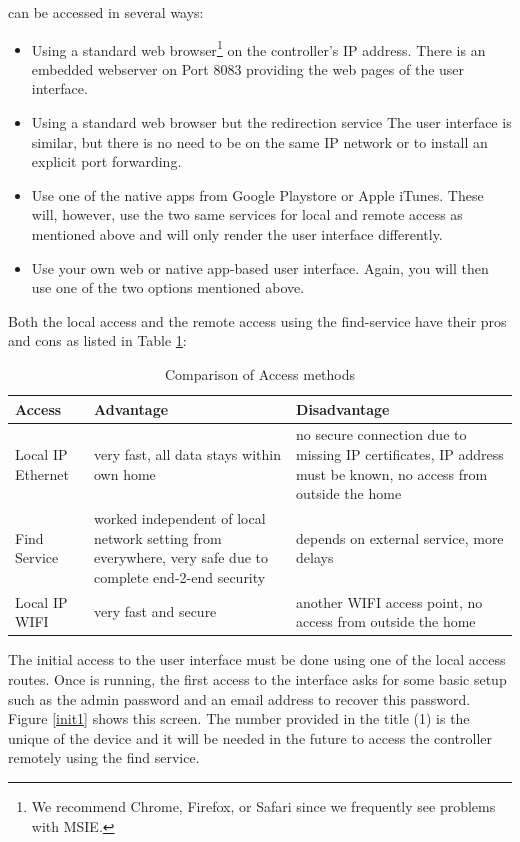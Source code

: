 \zway can be accessed in several ways:

\begin{itemize}
\item Using a standard web browser\footnote{We recommend Chrome, Firefox, or Safari 
since we frequently see problems with MSIE.} on the controller’s IP address. There is an 
embedded webserver on Port 8083 providing the web pages of the user interface.
\item Using a standard web browser but the redirection service  The 
user interface is similar, but there is no need to be on the same IP network or to 
install an explicit port forwarding.
\item Use one of the native apps from Google Playstore or Apple iTunes. These will, 
however, use the two same services for local and remote access as mentioned above and 
will only render the user interface differently.
\item Use your own web or native app-based user interface. Again, you will then use one 
of the two options mentioned above.
\end{itemize}

Both the local access and the remote access using the find-service have their pros and 
cons as listed in Table \ref{compaccess}:

\begin{table}
\begin{tabular}{|p{}|p{}|p{}|}
\hline
Access &	Advantage & Disadvantage\\
\hline
Local IP Ethernet&	very fast, all data stays within own home & no secure connection due
to missing IP certificates, IP address must be known, no access from outside the home\\
\hline
Find Service &	worked independent of local network setting from everywhere, very safe
due to complete end-2-end security & depends on external service, more delays\\
\hline
Local IP WIFI&	very fast and secure & another WIFI access point, no access from outside the home  \\
\hline
\end{tabular}
\caption{Comparison of Access methods}
\label{compaccess}
\end{table}		

The initial access to the user interface must be done using one of the local access routes. 
Once \zway is running, the first access to the interface asks for some basic setup such 
as the admin password and an email address to recover this password. Figure \ref{init1} 
shows this screen.
The number provided in the title (1) is the unique \zwaydeviceid of the device and it will be needed 
in the future to access the controller remotely using the find service. 


